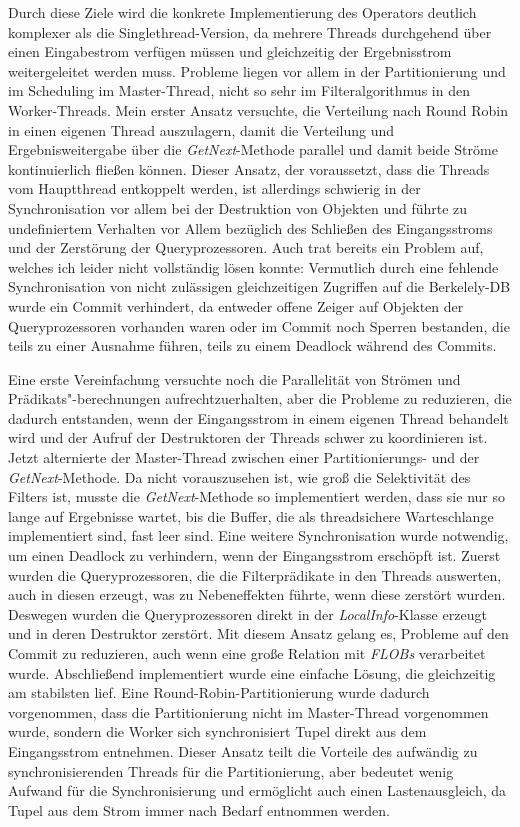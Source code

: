 \documentclass[a4paper,12pt,twoside]{article}
\newcommand{\Fb}[1]{\textit{#1}} %
\begin{document}
Durch diese Ziele wird die konkrete Implementierung des Operators deutlich komplexer als die Singlethread-Version, da mehrere Threads durchgehend über einen Eingabestrom verfügen müssen und gleichzeitig der Ergebnisstrom weitergeleitet werden muss. Probleme liegen vor allem in der Partitionierung und im Scheduling im Master-Thread, nicht so sehr im Filteralgorithmus in den Worker-Threads. Mein erster Ansatz versuchte, die Verteilung nach Round Robin in einen eigenen Thread auszulagern, damit die Verteilung und Ergebnisweitergabe über die \Fb{\Fb{GetNext}}-Methode parallel und damit beide Ströme kontinuierlich fließen können. Dieser Ansatz, der voraussetzt, dass die Threads vom Hauptthread entkoppelt werden, ist allerdings schwierig in der Synchronisation vor allem bei der Destruktion von Objekten und führte zu undefiniertem Verhalten vor Allem bezüglich des Schließen des Eingangsstroms und der Zerstörung der Queryprozessoren. Auch trat bereits ein Problem auf, welches ich leider nicht vollständig lösen konnte: Vermutlich durch eine fehlende Synchronisation von nicht zulässigen gleichzeitigen Zugriffen auf die Berkelely-DB wurde ein Commit verhindert, da entweder offene Zeiger auf Objekten der Queryprozessoren vorhanden waren oder im Commit noch Sperren bestanden, die teils zu einer Ausnahme führen, teils zu einem Deadlock während des Commits.

Eine erste Vereinfachung versuchte noch die Parallelität von Strömen und Prädikats"-berechnungen aufrechtzuerhalten, aber die Probleme zu reduzieren, die dadurch entstanden, wenn der Eingangsstrom in einem eigenen Thread behandelt wird und der Aufruf der Destruktoren der Threads schwer zu koordinieren ist. Jetzt alternierte der Master-Thread zwischen einer Partitionierungs- und der \Fb{GetNext}-Methode. Da nicht vorauszusehen ist, wie groß die Selektivität des Filters ist, musste die \Fb{GetNext}-Methode so implementiert werden, dass sie nur so lange auf Ergebnisse wartet, bis die Buffer, die als threadsichere Warteschlange implementiert sind, fast leer sind. Eine weitere Synchronisation wurde notwendig, um einen Deadlock zu verhindern, wenn der Eingangsstrom erschöpft ist. Zuerst wurden die Queryprozessoren, die die Filterprädikate in den Threads auswerten, auch in diesen erzeugt, was zu Nebeneffekten führte, wenn diese zerstört wurden. Deswegen wurden die Queryprozessoren direkt in der \Fb{LocalInfo}-Klasse erzeugt und in deren Destruktor zerstört. Mit diesem Ansatz gelang es, Probleme auf den Commit zu reduzieren, auch wenn eine große Relation mit \Fb{FLOBs} verarbeitet wurde. Abschließend implementiert wurde eine einfache Lösung, die gleichzeitig am stabilsten lief. Eine Round-Robin-Partitionierung wurde dadurch vorgenommen, dass die Partitionierung nicht im Master-Thread vorgenommen wurde, sondern die Worker sich synchronisiert Tupel direkt aus dem Eingangsstrom entnehmen. Dieser Ansatz teilt die Vorteile des aufwändig zu synchronisierenden Threads für die Partitionierung, aber bedeutet wenig Aufwand für die Synchronisierung und ermöglicht auch einen Lastenausgleich, da Tupel aus dem Strom immer nach Bedarf entnommen werden.
\end{document}
